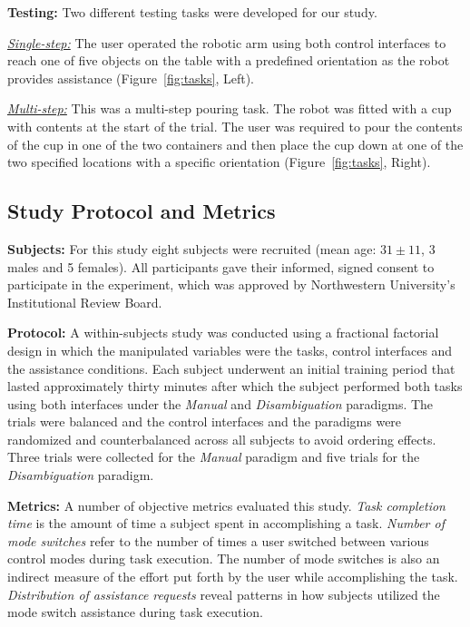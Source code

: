 \noindent\textbf{Testing:} Two different testing tasks were developed for our study. 

\noindent\underline{\textit{Single-step:}} The user operated the robotic arm using both control interfaces to reach one of five objects on the table with a predefined orientation as the robot provides assistance (Figure~\ref{fig:tasks}, Left). 

\noindent\underline{\textit{Multi-step:}} This was a multi-step pouring task. The robot was fitted with a cup with contents at the start of the trial. The user was required to pour the contents of the cup in one of the two containers and then place the cup down at one of the two specified locations with a specific orientation (Figure~\ref{fig:tasks}, Right). 

\subsection{Study Protocol and Metrics}
\noindent\textbf{Subjects:} For this study eight subjects were recruited (mean age: $31 \pm 11$, 3 males and 5 females). All participants gave their informed, signed consent to participate in the experiment, which was approved by Northwestern University's Institutional Review Board. 

\noindent\textbf{Protocol:}
A within-subjects study was conducted using a fractional factorial design in which the manipulated variables were the tasks, control interfaces and the assistance conditions. Each subject underwent an initial training period that lasted approximately thirty minutes after which the subject performed both tasks using both interfaces under the \textit{Manual} and \textit{Disambiguation} paradigms. The trials were balanced and the control interfaces and the paradigms were randomized and counterbalanced across all subjects to avoid ordering effects. Three trials were collected for the \textit{Manual} paradigm and five trials for the \textit{Disambiguation} paradigm. 

\noindent\textbf{Metrics:}
A number of objective metrics evaluated this study. \textit{Task completion time} is the amount of time a subject spent in accomplishing a task. \textit{Number of mode switches} refer to the number of times a user switched between various control modes during task execution. The number of mode switches is also an indirect measure of the effort put forth by the user while accomplishing the task. \textit{Distribution of assistance requests} reveal patterns in how subjects utilized the mode switch assistance during task execution. 
%


